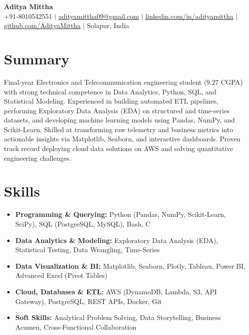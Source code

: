 \documentclass[letterpaper,10pt]{article}
\begin{document}
\begin{center}
  {\LARGE \textbf{Aditya Mittha}} \\[3pt]
  \small
  +91-8010542551 \enspace $|$ \enspace
  \href{mailto:adityamittha09@gmail.com}{adityamittha09@gmail.com} \enspace $|$ \enspace
  \href{https://www.linkedin.com/in/adityamittha}{linkedin.com/in/adityamittha} \enspace $|$ \enspace
  \href{https://github.com/AdityaMittha}{github.com/AdityaMittha} \enspace $|$ \enspace
  Solapur, India
\end{center}

\vspace{-14pt}

\section{Summary}
\small
Final-year Electronics and Telecommunication engineering student (9.27 CGPA) with strong technical competence in Data Analytics, Python, SQL, and Statistical Modeling. Experienced in building automated ETL pipelines, performing Exploratory Data Analysis (EDA) on structured and time-series datasets, and developing machine learning models using Pandas, NumPy, and Scikit-Learn. Skilled at transforming raw telemetry and business metrics into actionable insights via Matplotlib, Seaborn, and interactive dashboards. Proven track record deploying cloud data solutions on AWS and solving quantitative engineering challenges.

\vspace{-4pt}

\section{Skills}
\small
\begin{itemize}[leftmargin=0.18in, label={}, topsep=0pt, parsep=1pt, itemsep=1pt]
  \item \textbf{Programming \& Querying:} Python (Pandas, NumPy, Scikit-Learn, SciPy), SQL (PostgreSQL, MySQL), Bash, C
  \item \textbf{Data Analytics \& Modeling:} Exploratory Data Analysis (EDA), Statistical Testing, Data Wrangling, Time-Series
  \item \textbf{Data Visualization \& BI:} Matplotlib, Seaborn, Plotly, Tableau, Power BI, Advanced Excel (Pivot Tables)
  \item \textbf{Cloud, Databases \& ETL:} AWS (DynamoDB, Lambda, S3, API Gateway), PostgreSQL, REST APIs, Docker, Git
  \item \textbf{Soft Skills:} Analytical Problem Solving, Data Storytelling, Business Acumen, Cross-Functional Collaboration
\end{itemize}
\end{document}
